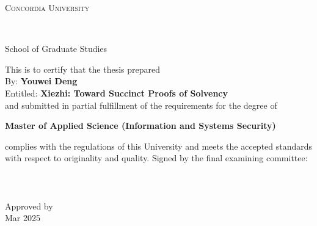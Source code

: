 
\thispagestyle{empty} %

\begin{center}\begin{Large} \textsc{Concordia University} \end{Large} \\
\begin{large} School of Graduate Studies \end{large} \end{center}
\vfill
This is to certify that the thesis prepared\\
By: \tab   \textbf{Youwei Deng} \\
Entitled: \tab \textbf{Xiezhi: Toward Succinct Proofs of Solvency}\\
 and submitted in partial fulfillment of the requirements for the degree of
\begin{center}
\textbf{Master of Applied Science (Information and Systems Security)}
\end{center}
complies with the regulations of this University and meets the
accepted standards with respect to originality and quality.
\vfill
\noindent Signed by the final examining committee: \\[1.3em]
\hspace*{1cm} \hrulefill {} \\[1.3em]
\hspace*{1cm} \hrulefill {} \\[1.3em]
\hspace*{1cm} \hrulefill {} \\[1.3em]
\vfill
\noindent Approved by \hrulefill \\[1.3em]
 Mar 2025 \hrulefill \\
